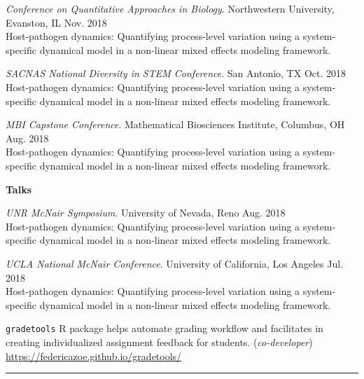 \documentclass{article}
\begin{document}
\begin{description}
		\textit{Conference on Quantitative Approaches in Biology}. Northwestern University, Evanston, IL \hfill{Nov. 2018}\\
		Host-pathogen dynamics: Quantifying process-level variation using a system-specific dynamical model in a non-linear mixed effects modeling framework. 
		\vspace*{1mm}
		
		\textit{SACNAS National Diversity in STEM Conference}. San Antonio, TX \hfill{Oct. 2018}\\
		Host-pathogen dynamics: Quantifying process-level variation using a system-specific dynamical model in a non-linear mixed effects modeling framework.
		\vspace*{1mm}
		 
		\textit{MBI Capstone Conference}. Mathematical Biosciences Institute, Columbus, OH \hfill{Aug. 2018}\\
		Host-pathogen dynamics: Quantifying process-level variation using a system-specific dynamical model in a non-linear mixed effects modeling framework.
		\vspace*{1mm}
		
		\setlength{\leftskip}{0cm}
	
	\textbf{Talks}
	
	\setlength{\leftskip}{0.5cm}
	
		\vspace*{1mm}	
		
		\textit{UNR McNair Symposium}. University of Nevada, Reno \hfill{Aug. 2018}\\
		Host-pathogen dynamics: Quantifying process-level variation using a system-specific dynamical model in a non-linear mixed effects modeling framework.
		\vspace*{1mm}
		
		\textit{UCLA National McNair Conference}. University of California, Los Angeles \hfill{Jul. 2018}\\
		Host-pathogen dynamics: Quantifying process-level variation using a system-specific dynamical model in a non-linear mixed effects modeling framework.
		\vspace*{1mm}
		
	
\end{description}



\begin{description}
	\vspace{-2mm}
	\item[Software Developed]\hspace*{.1in} 
	
	\texttt{gradetools} R package helps automate grading workflow and facilitates in creating individualized assignment feedback for students. (\textit{co-developer}) \url{https://federicazoe.github.io/gradetools/}
	
\end{description}
\vspace{-2mm}
\rule{\linewidth}{1pt}
\end{document}
